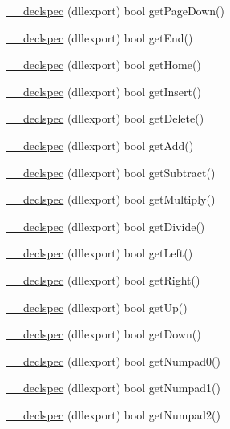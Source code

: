 \begin{DoxyCompactItemize}
\hyperlink{class_update_data_ac6add42914389838494eea0e35dbbb9d}{\-\_\-\-\_\-declspec} (dllexport) bool get\-Page\-Down()
\item 
\hyperlink{class_update_data_a96b2a0c14702abcb7e706fb0c083bfeb}{\-\_\-\-\_\-declspec} (dllexport) bool get\-End()
\item 
\hyperlink{class_update_data_a98c5c1757bb7761e17c73f5c6d4f1945}{\-\_\-\-\_\-declspec} (dllexport) bool get\-Home()
\item 
\hyperlink{class_update_data_a9c809eb867ff9546119747e391e37371}{\-\_\-\-\_\-declspec} (dllexport) bool get\-Insert()
\item 
\hyperlink{class_update_data_afc1e58b4fc6c5dbdd44091b687ec4c47}{\-\_\-\-\_\-declspec} (dllexport) bool get\-Delete()
\item 
\hyperlink{class_update_data_aa26fa69f873370234141ef50ca761fe9}{\-\_\-\-\_\-declspec} (dllexport) bool get\-Add()
\item 
\hyperlink{class_update_data_ab85d755beeeb6278d1973e6cf23cde4d}{\-\_\-\-\_\-declspec} (dllexport) bool get\-Subtract()
\item 
\hyperlink{class_update_data_a66a7ffefa465f96f1a5aa968b9db65f1}{\-\_\-\-\_\-declspec} (dllexport) bool get\-Multiply()
\item 
\hyperlink{class_update_data_aba6d5a7e25e8f22c2c0563dd0a423cef}{\-\_\-\-\_\-declspec} (dllexport) bool get\-Divide()
\item 
\hyperlink{class_update_data_a7dff23c47abae3138fabe0d9511fddbd}{\-\_\-\-\_\-declspec} (dllexport) bool get\-Left()
\item 
\hyperlink{class_update_data_af89523cb0a8a6e4a12c324337900f193}{\-\_\-\-\_\-declspec} (dllexport) bool get\-Right()
\item 
\hyperlink{class_update_data_a352440299b6ea131798cd35cfc6b4640}{\-\_\-\-\_\-declspec} (dllexport) bool get\-Up()
\item 
\hyperlink{class_update_data_a411d71e8934633a427bac91708c70c37}{\-\_\-\-\_\-declspec} (dllexport) bool get\-Down()
\item 
\hyperlink{class_update_data_a2c114653b5d7e543fb996f062b8d0d6b}{\-\_\-\-\_\-declspec} (dllexport) bool get\-Numpad0()
\item 
\hyperlink{class_update_data_ab9da58b971270c362ee76ded2ce8dd88}{\-\_\-\-\_\-declspec} (dllexport) bool get\-Numpad1()
\item 
\hyperlink{class_update_data_a1863e3fca00ac79b69956a67116cebca}{\-\_\-\-\_\-declspec} (dllexport) bool get\-Numpad2()
\item 

\end{DoxyCompactItemize}

